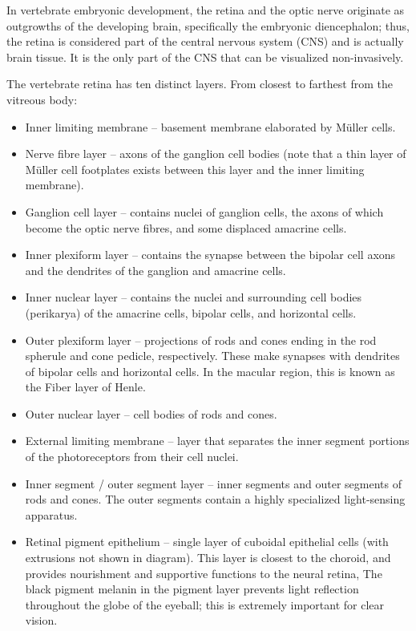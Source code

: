 In vertebrate embryonic development, the retina and the optic nerve originate as outgrowths of the developing brain, specifically the embryonic diencephalon; thus, the retina is considered part of the central nervous system (CNS) and is actually brain tissue. It is the only part of the CNS that can be visualized non-invasively.

The vertebrate retina has ten distinct layers. From closest to farthest from the vitreous body:

\begin{itemize}
\tightlist
\item
  Inner limiting membrane -- basement membrane elaborated by Müller cells.
\item
  Nerve fibre layer -- axons of the ganglion cell bodies (note that a thin layer of Müller cell footplates exists between this layer and the inner limiting membrane).
\item
  Ganglion cell layer -- contains nuclei of ganglion cells, the axons of which become the optic nerve fibres, and some displaced amacrine cells.
\item
  Inner plexiform layer -- contains the synapse between the bipolar cell axons and the dendrites of the ganglion and amacrine cells.
\item
  Inner nuclear layer -- contains the nuclei and surrounding cell bodies (perikarya) of the amacrine cells, bipolar cells, and horizontal cells.
\item
  Outer plexiform layer -- projections of rods and cones ending in the rod spherule and cone pedicle, respectively. These make synapses with dendrites of bipolar cells and horizontal cells. In the macular region, this is known as the Fiber layer of Henle.
\item
  Outer nuclear layer -- cell bodies of rods and cones.
\item
  External limiting membrane -- layer that separates the inner segment portions of the photoreceptors from their cell nuclei.
\item
  Inner segment / outer segment layer -- inner segments and outer segments of rods and cones. The outer segments contain a highly specialized light-sensing apparatus.
\item
  Retinal pigment epithelium -- single layer of cuboidal epithelial cells (with extrusions not shown in diagram). This layer is closest to the choroid, and provides nourishment and supportive functions to the neural retina, The black pigment melanin in the pigment layer prevents light reflection throughout the globe of the eyeball; this is extremely important for clear vision.
\end{itemize}

